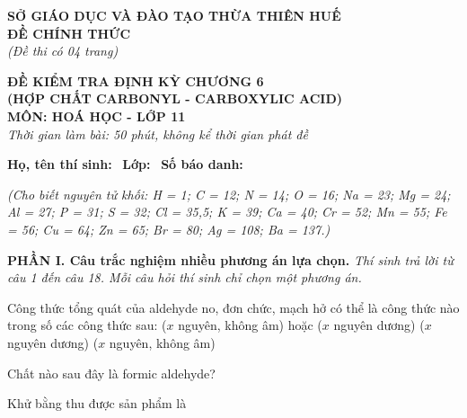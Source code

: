 \documentclass[12pt,a4paper]{article}
\begin{document}
\thispagestyle{firstpage}

\noindent
\begin{minipage}[t]{0.44\textwidth}
	\centering\fontsize{10pt}{12pt}\selectfont
	\textbf{SỞ GIÁO DỤC VÀ ĐÀO TẠO THỪA THIÊN HUẾ}\\
	\textbf{ĐỀ CHÍNH THỨC}\\
	\textit{(Đề thi có 04 trang)}
\end{minipage}\hfill
\begin{minipage}[t]{0.54\textwidth}
	\centering\fontsize{10.5pt}{13pt}\selectfont
	\textbf{ĐỀ KIỂM TRA ĐỊNH KỲ CHƯƠNG 6}\\
	\textbf{(HỢP CHẤT CARBONYL - CARBOXYLIC ACID)}\\
	\textbf{MÔN: HOÁ HỌC - LỚP 11}\\
	\textit{Thời gian làm bài: 50 phút, không kể thời gian phát đề}
	
	\smallskip
\end{minipage}

\smallskip
\noindent\hrulefill
\smallskip

\noindent\textbf{Họ, tên thí sinh:} \dotfill\ \textbf{Lớp:} \dotfill\ \textbf{Số báo danh:} \dotfill

\smallskip
\noindent\textit{(Cho biết nguyên tử khối: H = 1; C = 12; N = 14; O = 16; Na = 23; Mg = 24; Al = 27; P = 31; S = 32; Cl = 35,5; K = 39; Ca = 40; Cr = 52; Mn = 55; Fe = 56; Cu = 64; Zn = 65; Br = 80; Ag = 108; Ba = 137.)}

\smallskip
\noindent\textbf{\large PHẦN I. Câu trắc nghiệm nhiều phương án lựa chọn.}
\textit{Thí sinh trả lời từ câu 1 đến câu 18. Mỗi câu hỏi thí sinh chỉ chọn một phương án.}
\vspace{0.2cm}

\begin{ex}
Công thức tổng quát của aldehyde no, đơn chức, mạch hở có thể là công thức nào trong số các công thức sau:
\choice
{ ($x$ nguyên, không âm) hoặc  ($x$ nguyên dương)}
{ ($x$ nguyên dương)}
{ ($x$ nguyên, không âm)}
{}
\end{ex}

\begin{ex}
Chất nào sau đây là formic aldehyde?
\choice
{}
{}
{}
{}
\end{ex}

\begin{ex}
Khử  bằng  thu được sản phẩm là
\choice
{}
{}
{}
{}
\end{ex}
\end{document}
